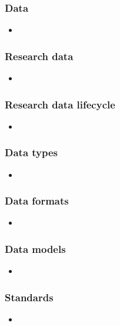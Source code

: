 \documentclass{beamer}
\begin{document}
\begin{frame}
  \frametitle{Data}
  
  \begin{itemize}
  \item 
  \end{itemize}
\end{frame}

\begin{frame}
  \frametitle{Research data}
  
  \begin{itemize}
  \item 
  \end{itemize}
\end{frame}

\begin{frame}
  \frametitle{Research data lifecycle}
  
  \begin{itemize}
  \item 
  \end{itemize}
\end{frame}

\begin{frame}
  \frametitle{Data types}
  
  \begin{itemize}
  \item 
  \end{itemize}
\end{frame}

\begin{frame}
  \frametitle{Data formats}
  
  \begin{itemize}
  \item 
  \end{itemize}
\end{frame}

\begin{frame}
  \frametitle{Data models}
  
  \begin{itemize}
  \item 
  \end{itemize}
\end{frame}

\begin{frame}
  \frametitle{Standards}
  
  \begin{itemize}
  \item 
  \end{itemize}
\end{frame}
\end{document}
